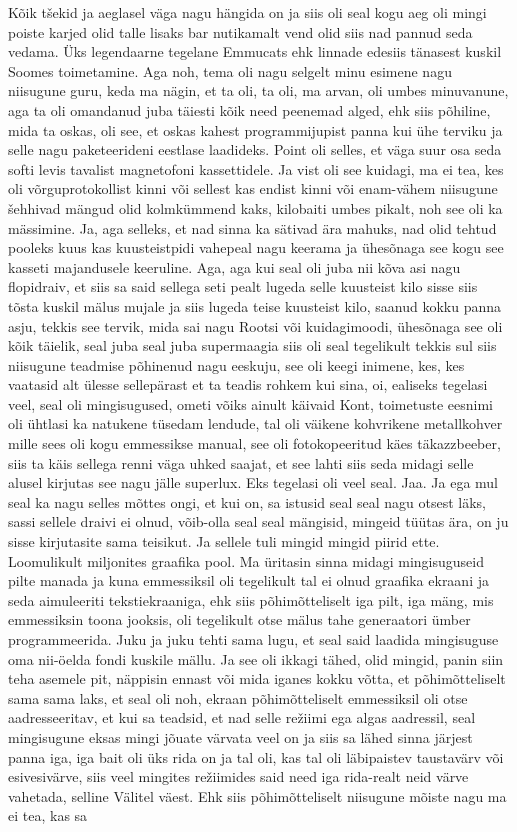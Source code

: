 Kõik tšekid ja aeglasel väga nagu hängida on ja siis oli seal kogu aeg oli mingi poiste karjed olid talle lisaks bar nutikamalt vend olid siis nad pannud seda vedama. Üks legendaarne tegelane Emmucats ehk linnade edesiis tänasest kuskil Soomes toimetamine. Aga noh, tema oli nagu selgelt minu esimene nagu niisugune guru, keda ma nägin, et ta oli, ta oli, ma arvan, oli umbes minuvanune, aga ta oli omandanud juba täiesti kõik need peenemad alged, ehk siis põhiline, mida ta oskas, oli see, et oskas kahest programmijupist panna kui ühe terviku ja selle nagu paketeerideni eestlase laadideks. Point oli selles, et väga suur osa seda softi levis tavalist magnetofoni kassettidele. Ja vist oli see kuidagi, ma ei tea, kes oli võrguprotokollist kinni või sellest kas endist kinni või enam-vähem niisugune šehhivad mängud olid kolmkümmend kaks, kilobaiti umbes pikalt, noh see oli ka mässimine. Ja, aga selleks, et nad sinna ka sätivad ära mahuks, nad olid tehtud pooleks kuus kas kuusteistpidi vahepeal nagu keerama ja ühesõnaga see kogu see kasseti majandusele keeruline. Aga, aga kui seal oli juba nii kõva asi nagu flopidraiv, et siis sa said sellega seti pealt lugeda selle kuusteist kilo sisse siis tõsta kuskil mälus mujale ja siis lugeda teise kuusteist kilo, saanud kokku panna asju, tekkis see tervik, mida sai nagu Rootsi või kuidagimoodi, ühesõnaga see oli kõik täielik, seal juba seal juba supermaagia siis oli seal tegelikult tekkis sul siis niisugune teadmise põhinenud nagu eeskuju, see oli keegi inimene, kes, kes vaatasid alt ülesse sellepärast et ta teadis rohkem kui sina, oi, ealiseks tegelasi veel, seal oli mingisugused, ometi võiks ainult käivaid Kont, toimetuste eesnimi oli ühtlasi ka natukene tüsedam lendude, tal oli väikene kohvrikene metallkohver mille sees oli kogu emmessikse manual, see oli fotokopeeritud käes täkazzbeeber, siis ta käis sellega renni väga uhked saajat, et see lahti siis seda midagi selle alusel kirjutas see nagu jälle superlux. Eks tegelasi oli veel seal. Jaa. Ja ega mul seal ka nagu selles mõttes ongi, et kui on, sa istusid seal seal nagu otsest läks, sassi sellele draivi ei olnud, võib-olla seal seal mängisid, mingeid tüütas ära, on ju sisse kirjutasite sama teisikut. Ja sellele tuli mingid mingid piirid ette. Loomulikult miljonites graafika pool. Ma üritasin sinna midagi mingisuguseid pilte manada ja kuna emmessiksil oli tegelikult tal ei olnud graafika ekraani ja seda aimuleeriti tekstiekraaniga, ehk siis põhimõtteliselt iga pilt, iga mäng, mis emmessiksin toona jooksis, oli tegelikult otse mälus tahe generaatori ümber programmeerida. Juku ja juku tehti sama lugu, et seal said laadida mingisuguse oma nii-öelda fondi kuskile mällu. Ja see oli ikkagi tähed, olid mingid, panin siin teha asemele pit, näppisin ennast või mida iganes kokku võtta, et põhimõtteliselt sama sama laks, et seal oli noh, ekraan põhimõtteliselt emmessiksil oli otse aadresseeritav, et kui sa teadsid, et nad selle režiimi ega algas aadressil, seal mingisugune eksas mingi jõuate värvata veel on ja siis sa lähed sinna järjest panna iga, iga bait oli üks rida on ja tal oli, kas tal oli läbipaistev taustavärv või esivesivärve, siis veel mingites režiimides said need iga rida-realt neid värve vahetada, selline Välitel väest. Ehk siis põhimõtteliselt niisugune mõiste nagu ma ei tea, kas sa 